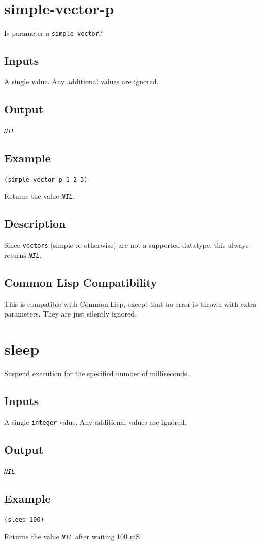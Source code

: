 \documentclass[10pt, openany]{book}
\newcommand{\constant}[1]{\emph{\texttt{#1}}}
\newcommand{\datatype}[1]{\texttt{#1}}
\newcommand{\cl}{Common Lisp}
\begin{document}
\section{simple-vector-p}
Is parameter a \datatype{simple vector}?
\subsection{Inputs}
A single value.  Any additional values are ignored.
\subsection{Output}
\constant{NIL}.
\subsection{Example}
\begin{lstlisting}
(simple-vector-p 1 2 3)
\end{lstlisting}
Returns the value \constant{NIL}.
\subsection{Description}
Since \datatype{vectors} (simple or otherwise) are not a supported datatype, this always returns \constant{NIL}.
\subsection{Common Lisp Compatibility}
This is compatible with \cl, except that no error is thrown with extra parameters.  They are just silently ignored.

\section{sleep}
Suspend execution for the specified number of milliseconds.
\subsection{Inputs}
A single \datatype{integer} value.  Any additional values are ignored.
\subsection{Output}
\constant{NIL}.
\subsection{Example}
\begin{lstlisting}
(sleep 100)
\end{lstlisting}
Returns the value \constant{NIL} after waiting 100 mS.
\end{document}
